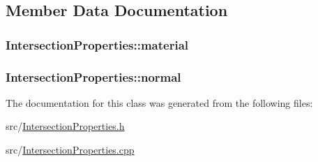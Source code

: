\subsection{Member Data Documentation}
\subsubsection[{\texorpdfstring{material}{material}}]{ Intersection\+Properties\+::material}\hypertarget{classIntersectionProperties_a52218ae741a9cd035eeed6cbc40b3300}{}\label{classIntersectionProperties_a52218ae741a9cd035eeed6cbc40b3300}
\subsubsection[{\texorpdfstring{normal}{normal}}]{ Intersection\+Properties\+::normal}\hypertarget{classIntersectionProperties_afb99c699b3116580c68936d033b09081}{}\label{classIntersectionProperties_afb99c699b3116580c68936d033b09081}


The documentation for this class was generated from the following files\+:\begin{DoxyCompactItemize}
\item 
src/\hyperlink{IntersectionProperties_8h}{Intersection\+Properties.\+h}\item 
src/\hyperlink{IntersectionProperties_8cpp}{Intersection\+Properties.\+cpp}\end{DoxyCompactItemize}
